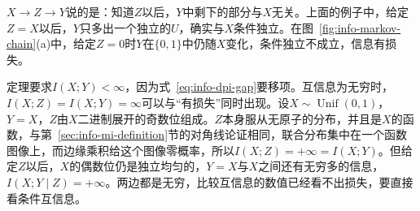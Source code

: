 $X\to Z\to Y$说的是：知道$Z$以后，$Y$中剩下的部分与$X$无关。上面的例子中，给定$Z=X$以后，$Y$只多出一个独立的$U$，确实与$X$条件独立。在图~\ref{fig:info-markov-chain}(a)中，给定$Z=0$时$Y$在$\{0,1\}$中仍随$X$变化，条件独立不成立，信息有损失。

定理要求$I(X;Y)<\infty$，因为式~\eqref{eq:info-dpi-gap}要移项。互信息为无穷时，$I(X;Z)=I(X;Y)=\infty$可以与“有损失”同时出现。设$X\sim\operatorname{Unif}(0,1)$，$Y=X$，$Z$由$X$二进制展开的奇数位组成。$Z$本身服从无原子的分布，并且是$X$的函数，与第~\ref{sec:info-mi-definition}节的对角线论证相同，联合分布集中在一个函数图像上，而边缘乘积给这个图像零概率，所以$I(X;Z)=+\infty=I(X;Y)$。但给定$Z$以后，$X$的偶数位仍是独立均匀的，$Y=X$与$X$之间还有无穷多的信息，$I(X;Y\mid Z)=+\infty$。两边都是无穷，比较互信息的数值已经看不出损失，要直接看条件互信息。
